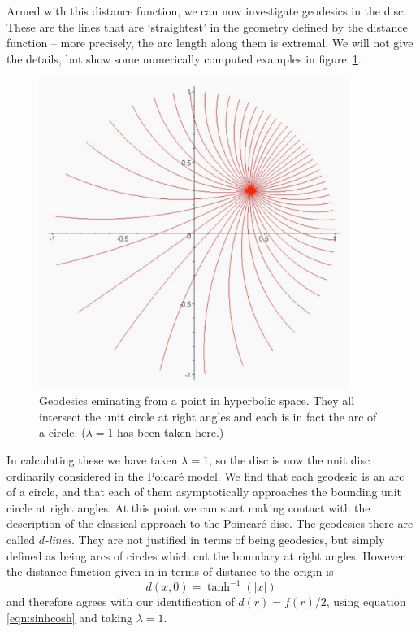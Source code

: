Armed with this distance function, we can now investigate
geodesics in the disc. These are the lines that are `straightest'
in the geometry defined by the distance function -- more precisely,
the arc length along them is extremal. We will not give the
details, but show some numerically computed examples in
figure~\ref{fig:hyper-geos}.
%
\begin{figure} \label{fig:hyper-geos}
\centerline{\includegraphics[width=0.9\textwidth]{hyper_geos}}
\caption{Geodesics eminating from a point in hyperbolic space.
They all intersect the unit circle at right angles and each is in
fact the arc of a circle. ($\lambda=1$ has been taken here.) }
\end{figure}
%
In calculating these we have taken $\lambda=1$, so the disc is now
the unit disc ordinarily considered in the Poicar\'e model. We
find that each geodesic is an arc of a circle, and that each of
them asymptotically approaches the bounding unit circle at right
angles. At this point we can start making contact with the
description of the classical approach to the Poincar\'e
disc\cite{GEOM:Brannan}. The geodesics there are called {\em $d$-lines}.
They are not justified in terms of being geodesics, but simply
defined as being arcs of circles which cut the boundary at right
angles. However the distance function given in \cite{GEOM:Brannan}
in terms of distance to the origin is
%
\begin{equation}
d(x,0) = \tanh^{-1}(|x|)
\end{equation}
%
and therefore agrees with our identification of $d(r)=
f(r)/2$, using equation \ref{eqn:sinhcosh} and
taking $\lambda=1$.

